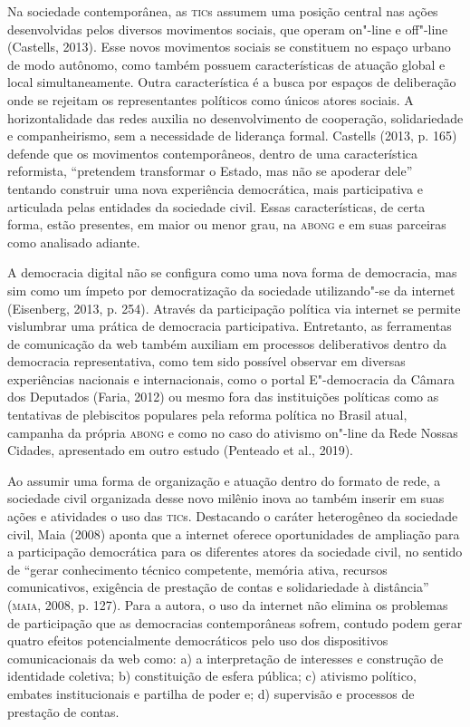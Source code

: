 Na sociedade contemporânea, as \textsc{tic}s assumem uma posição central nas
ações desenvolvidas pelos diversos movimentos sociais, que operam
on"-line e off"-line (Castells, 2013). Esse novos movimentos sociais se
constituem no espaço urbano de modo autônomo, como também possuem
características de atuação global e local simultaneamente. Outra
característica é a busca por espaços de deliberação onde se rejeitam os
representantes políticos como únicos atores sociais. A horizontalidade
das redes auxilia no desenvolvimento de cooperação, solidariedade e
companheirismo, sem a necessidade de liderança formal. Castells (2013,
p. 165) defende que os movimentos contemporâneos, dentro de uma
característica reformista, ``pretendem transformar o Estado, mas não se
apoderar dele'' tentando construir uma nova experiência democrática, mais
participativa e articulada pelas entidades da sociedade civil. Essas
características, de certa forma, estão presentes, em maior ou menor
grau, na \textsc{abong} e em suas parceiras como analisado adiante.

A democracia digital não se configura como uma nova forma de democracia,
mas sim como um ímpeto por democratização da sociedade utilizando"-se da
internet (Eisenberg, 2013, p. 254). Através da participação política via
internet se permite vislumbrar uma prática de democracia participativa.
Entretanto, as ferramentas de comunicação da web também auxiliam em
processos deliberativos dentro da democracia representativa, como tem
sido possível observar em diversas experiências nacionais e
internacionais, como o portal E"-democracia da Câmara dos Deputados
(Faria, 2012) ou mesmo fora das instituições políticas como as
tentativas de plebiscitos populares pela reforma política no Brasil
atual, campanha da própria \textsc{abong} e como no caso do ativismo on"-line da
Rede Nossas Cidades, apresentado em outro estudo (Penteado et al.,
2019).

Ao assumir uma forma de organização e atuação dentro do formato de rede,
a sociedade civil organizada desse novo milênio inova ao também inserir
em suas ações e atividades o uso das \textsc{tic}s. Destacando o caráter
heterogêneo da sociedade civil, Maia (2008) aponta que a internet
oferece oportunidades de ampliação para a participação democrática para
os diferentes atores da sociedade civil, no sentido de ``gerar
conhecimento técnico competente, memória ativa, recursos comunicativos,
exigência de prestação de contas e solidariedade à distância'' (\textsc{maia},
2008, p. 127). Para a autora, o uso da internet não elimina os problemas
de participação que as democracias contemporâneas sofrem, contudo podem
gerar quatro efeitos potencialmente democráticos pelo uso dos
dispositivos comunicacionais da web como: a) a interpretação de
interesses e construção de identidade coletiva; b) constituição de
esfera pública; c) ativismo político, embates institucionais e partilha
de poder e; d) supervisão e processos de prestação de contas.

